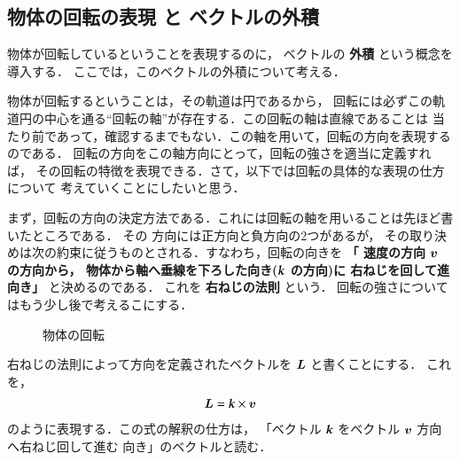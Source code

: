         \subsection{物体の回転の表現 と ベクトルの外積}
            物体が回転しているということを表現するのに，
            ベクトルの \textbf{外積} という概念を導入する．
            ここでは，このベクトルの外積について考える．

            物体が回転するということは，その軌道は円であるから，
            回転には必ずこの軌道円の中心を通る“回転の軸”が存在する．この回転の軸は直線であることは
            当たり前であって，確認するまでもない．この軸を用いて，回転の方向を表現するのである．
            回転の方向をこの軸方向にとって，回転の強さを適当に定義すれば，
            その回転の特徴を表現できる．さて，以下では回転の具体的な表現の仕方について
            考えていくことにしたいと思う．

            まず，回転の方向の決定方法である．これには回転の軸を用いることは先ほど書いたところである．
            その
            方向には正方向と負方向の2つがあるが，
            その取り決めは次の約束に従うものとされる．すなわち，回転の向きを
            \textbf{「
            速度の方向 $\boldsymbol{v}$ の方向から，
            物体から軸へ垂線を下ろした向き($\textbf{\textit{k}}$ の方向)に
            右ねじを回して進向き」} と決めるのである．
            これを \textbf{右ねじの法則} という．
            回転の強さについてはもう少し後で考えるこにする．
                        \begin{figure}[hbt]
                            \begin{center}
                                \caption{物体の回転}
                                \label{fig:gaiseki1new}
                            \end{center}
                        \end{figure}

            右ねじの法則によって方向を定義されたベクトルを $\boldsymbol{L}$ と書くことにする．
            これを，
            \begin{align}
            \boldsymbol{L}=\textbf{\textit{k}} \times \boldsymbol{v}
            \end{align}
            のように表現する．この式の解釈の仕方は，
            「ベクトル $\textbf{\textit{k}}$ をベクトル $\boldsymbol{v}$ 方向へ右ねじ回して進む
            向き」のベクトルと読む．

